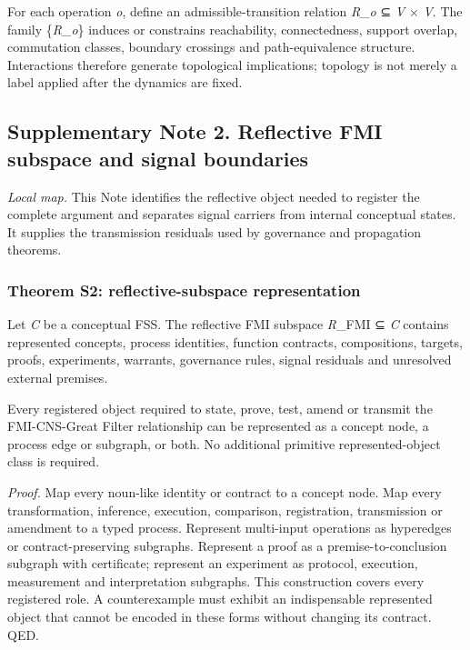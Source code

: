 For each operation \emph{o}, define an admissible-transition relation
\emph{R\_o} ⊆ \emph{V} × \emph{V}. The family \{\emph{R\_o}\} induces or
constrains reachability, connectedness, support overlap, commutation
classes, boundary crossings and path-equivalence structure. Interactions
therefore generate topological implications; topology is not merely a
label applied after the dynamics are fixed.

\hypertarget{supplementary-note-2.-reflective-fmi-subspace-and-signal-boundaries}{%
\subsection{Supplementary Note 2. Reflective FMI subspace and signal
boundaries}\label{supplementary-note-2.-reflective-fmi-subspace-and-signal-boundaries}}

\emph{Local map.} This Note identifies the reflective object needed to
register the complete argument and separates signal carriers from
internal conceptual states. It supplies the transmission residuals used
by governance and propagation theorems.

\hypertarget{theorem-s2-reflective-subspace-representation}{%
\subsubsection{Theorem S2: reflective-subspace
representation}\label{theorem-s2-reflective-subspace-representation}}

Let \emph{C} be a conceptual FSS. The reflective FMI subspace
\emph{R}\_FMI ⊆ \emph{C} contains represented concepts, process
identities, function contracts, compositions, targets, proofs,
experiments, warrants, governance rules, signal residuals and unresolved
external premises.

Every registered object required to state, prove, test, amend or
transmit the FMI-CNS-Great Filter relationship can be represented as a
concept node, a process edge or subgraph, or both. No additional
primitive represented-object class is required.

\emph{Proof.} Map every noun-like identity or contract to a concept
node. Map every transformation, inference, execution, comparison,
registration, transmission or amendment to a typed process. Represent
multi-input operations as hyperedges or contract-preserving subgraphs.
Represent a proof as a premise-to-conclusion subgraph with certificate;
represent an experiment as protocol, execution, measurement and
interpretation subgraphs. This construction covers every registered
role. A counterexample must exhibit an indispensable represented object
that cannot be encoded in these forms without changing its contract.
QED.

